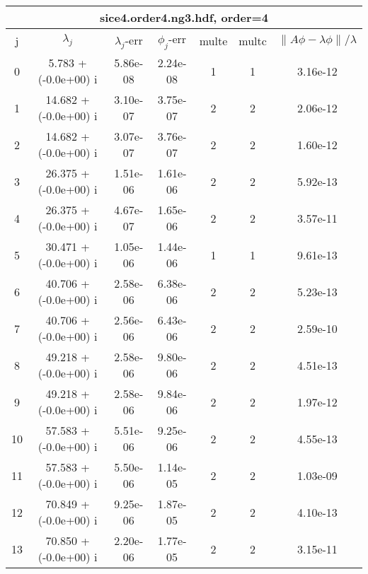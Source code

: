 \begin{table}[H]\tableFont %
\begin{center}
\begin{tabular}{|c|c|c|c|c|c|c|}  \hline
\multicolumn{7}{|c|}{sice4.order4.ng3.hdf, order=4} \\ \hline
   j    &         $\lambda_j$        & $\lambda_j$-err  & $\phi_j$-err  & multe & multc & $\| A\phi - \lambda\phi\|/\lambda$     \\ \hline
     0  &      5.783 + (-0.0e+00) i  &    5.86e-08      &   2.24e-08    &   1    &  1   &    3.16e-12 \\
     1  &     14.682 + (-0.0e+00) i  &    3.10e-07      &   3.75e-07    &   2    &  2   &    2.06e-12 \\
     2  &     14.682 + (-0.0e+00) i  &    3.07e-07      &   3.76e-07    &   2    &  2   &    1.60e-12 \\
     3  &     26.375 + (-0.0e+00) i  &    1.51e-06      &   1.61e-06    &   2    &  2   &    5.92e-13 \\
     4  &     26.375 + (-0.0e+00) i  &    4.67e-07      &   1.65e-06    &   2    &  2   &    3.57e-11 \\
     5  &     30.471 + (-0.0e+00) i  &    1.05e-06      &   1.44e-06    &   1    &  1   &    9.61e-13 \\
     6  &     40.706 + (-0.0e+00) i  &    2.58e-06      &   6.38e-06    &   2    &  2   &    5.23e-13 \\
     7  &     40.706 + (-0.0e+00) i  &    2.56e-06      &   6.43e-06    &   2    &  2   &    2.59e-10 \\
     8  &     49.218 + (-0.0e+00) i  &    2.58e-06      &   9.80e-06    &   2    &  2   &    4.51e-13 \\
     9  &     49.218 + (-0.0e+00) i  &    2.58e-06      &   9.84e-06    &   2    &  2   &    1.97e-12 \\
    10  &     57.583 + (-0.0e+00) i  &    5.51e-06      &   9.25e-06    &   2    &  2   &    4.55e-13 \\
    11  &     57.583 + (-0.0e+00) i  &    5.50e-06      &   1.14e-05    &   2    &  2   &    1.03e-09 \\
    12  &     70.849 + (-0.0e+00) i  &    9.25e-06      &   1.87e-05    &   2    &  2   &    4.10e-13 \\
    13  &     70.850 + (-0.0e+00) i  &    2.20e-06      &   1.77e-05    &   2    &  2   &    3.15e-11 \\

\end{tabular}
\end{center}
\end{table}
